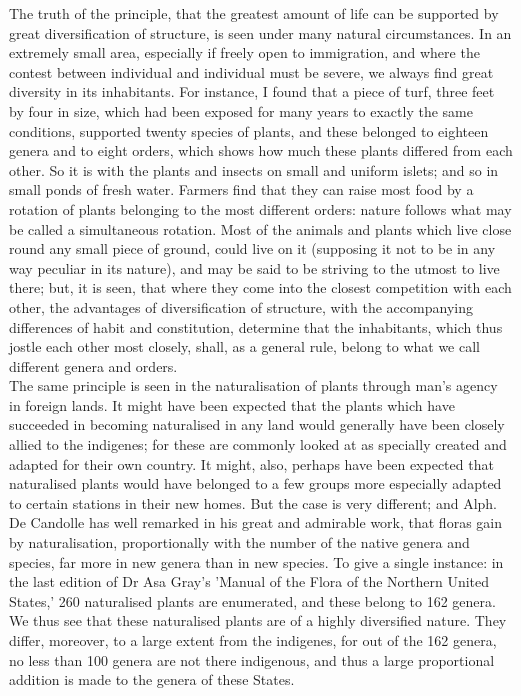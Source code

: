 \indent The truth of the principle, that the greatest amount of life can be supported by great diversification of structure, is seen under many natural circumstances.  In an extremely small area, especially if freely open to immigration, and where the contest between individual and individual must be severe, we always find great diversity in its inhabitants. For instance, I found that a piece of turf, three feet by four in size, which had been exposed for many years to exactly the same conditions, supported twenty species of plants, and these belonged to eighteen genera and to eight orders, which shows how much these plants differed from each other. So it is with the plants and insects on small and uniform islets; and so in small ponds of fresh water. Farmers find that they can raise most food by a rotation of plants belonging to the most different orders: nature follows what may be called a simultaneous rotation.  Most of the animals and plants which live close round any small piece of ground, could live on it (supposing it not to be in any way peculiar in its nature), and may be said to be striving to the utmost to live there; but, it is seen, that where they come into the closest competition with each other, the advantages of diversification of structure, with the accompanying differences of habit and constitution, determine that the inhabitants, which thus jostle each other most closely, shall, as a general rule, belong to what we call different genera and orders. \\
\indent The same principle is seen in the naturalisation of plants through man's agency in foreign lands. It might have been expected that the plants which have succeeded in becoming naturalised in any land would generally have been closely allied to the indigenes; for these are commonly looked at as specially created and adapted for their own country. It might, also, perhaps have been expected that naturalised plants would have belonged to a few groups more especially adapted to certain stations in their new homes.  But the case is very different; and Alph. De Candolle has well remarked in his great and admirable work, that floras gain by naturalisation, proportionally with the number of the native genera and species, far more in new genera than in new species. To give a single instance: in the last edition of Dr Asa Gray's 'Manual of the Flora of the Northern United States,' 260 naturalised plants are enumerated, and these belong to 162 genera. We thus see that these naturalised plants are of a highly diversified nature.  They differ, moreover, to a large extent from the indigenes, for out of the 162 genera, no less than 100 genera are not there indigenous, and thus a large proportional addition is made to the genera of these States. \\
